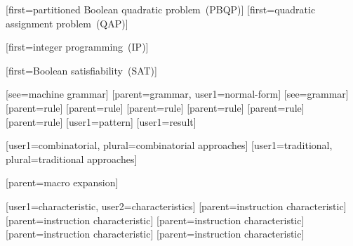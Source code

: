 %
        [first={partitioned Boolean quadratic problem~(PBQP)}]
%
        [first={quadratic assignment problem~(QAP)}]

%
        [first={integer programming~(IP)}]

%
        [first={Boolean satisfiability~(SAT)}]



[see={machine grammar}]
[parent={grammar}, user1={normal-form}]
[see={grammar}]
[parent={rule}]
[parent={rule}]
[parent={rule}]
[parent={rule}]
[parent={rule}]
[parent={rule}]
[user1={pattern}]
[user1={result}]



%
        [user1={combinatorial}, plural={combinatorial approaches}]
%
        [user1={traditional}, plural={traditional approaches}]

[parent={macro expansion}]

%
        [user1={characteristic}, user2={characteristics}]
%
        [parent={instruction characteristic}]
%
        [parent={instruction characteristic}]
%
        [parent={instruction characteristic}]
%
        [parent={instruction characteristic}]
%
        [parent={instruction characteristic}]

